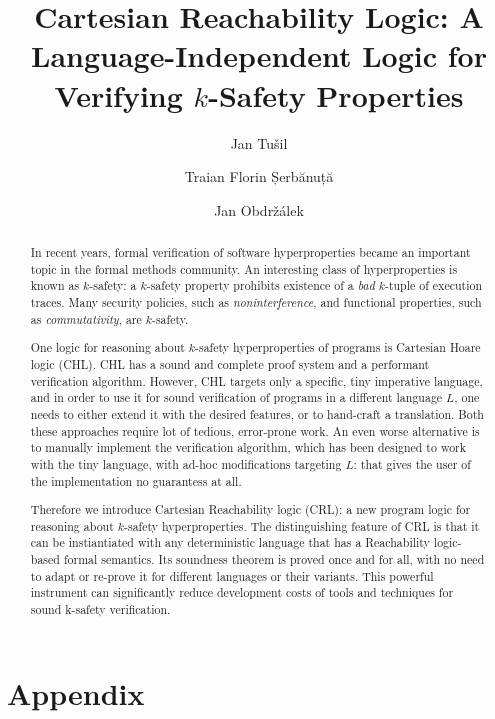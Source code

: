 \documentclass{easychair}
\title{Cartesian Reachability Logic: A Language-Independent Logic for Verifying $k$-Safety Properties}
\author{
  Jan Tu\v{s}il \inst{1}
  \and Traian Florin Șerbănuță  \inst{2}
  \and Jan Obdržálek \inst{1}
}
\institute{
  Masaryk University,
  Brno, Czech Republic\\
  \email{jan.tusil@mail.muni.cz}
\and
   University of Bucharest,
   Bucharest, Romania\\
   \email{traian.serbanuta@unibuc.ro}\\
 }
\begin{document}
\maketitle

\begin{abstract}
  In recent years, formal verification of software hyperproperties became an important topic in the
  formal methods community.
  An interesting class of hyperproperties is known as $k$-safety: a $k$-safety property prohibits
  existence of a \emph{bad} $k$-tuple of execution traces.
  Many security policies, such as \emph{noninterference}, and functional properties, such as \emph{commutativity},
  are $k$-safety.

  One logic for reasoning about $k$-safety hyperproperties of programs is Cartesian Hoare logic (CHL).
  CHL has a sound and complete proof system and a performant verification algorithm.
  However, CHL targets only a specific, tiny imperative language, and in order to use it for sound verification
  of programs in a different language $L$, one needs to either extend it with the desired features,
  or to hand-craft a translation.
  Both these approaches require lot of tedious, error-prone work.
  An even worse alternative is to manually implement the verification algorithm,
  which has been designed to work with the tiny language,
  with ad-hoc modifications targeting $L$: that gives the user of the implementation no guarantess at all.

  Therefore we introduce Cartesian Reachability logic (CRL): a new program logic for reasoning
  about $k$-safety hyperproperties.
  The distinguishing feature of CRL is that it can be instiantiated
  with any deterministic language
  that has a Reachability logic-based formal semantics.
  Its soundness theorem is proved once and for all, with no need to adapt or re-prove it for different
  languages or their variants.
  This powerful instrument can significantly reduce development costs of tools and techniques for
  sound k-safety verification.
\end{abstract}













\appendix

\section{Appendix}

\end{document}
